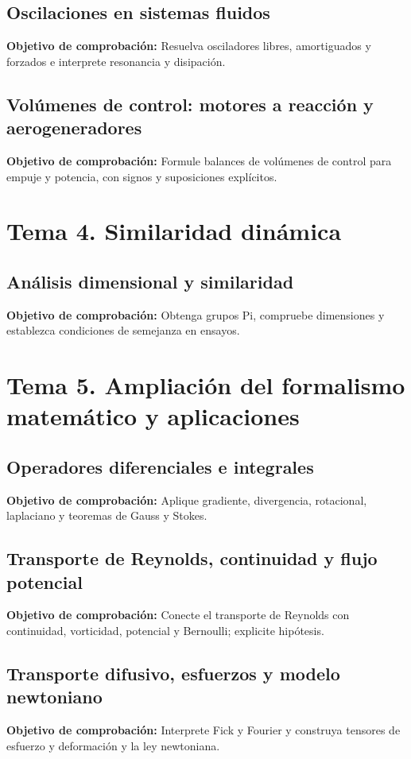 \documentclass[10pt,openany]{book}
\begin{document}
\subsection*{Oscilaciones en sistemas fluidos}
\noindent \textbf{Objetivo de comprobación:} Resuelva osciladores libres, amortiguados y forzados e interprete resonancia y disipación.

\subsection*{Volúmenes de control: motores a reacción y aerogeneradores}
\noindent \textbf{Objetivo de comprobación:} Formule balances de volúmenes de control para empuje y potencia, con signos y suposiciones explícitos.

\section*{Tema 4. Similaridad dinámica}

\subsection*{Análisis dimensional y similaridad}
\noindent \textbf{Objetivo de comprobación:} Obtenga grupos Pi, compruebe dimensiones y establezca condiciones de semejanza en ensayos.

\section*{Tema 5. Ampliación del formalismo matemático y aplicaciones}

\subsection*{Operadores diferenciales e integrales}
\noindent \textbf{Objetivo de comprobación:} Aplique gradiente, divergencia, rotacional, laplaciano y teoremas de Gauss y Stokes.

\subsection*{Transporte de Reynolds, continuidad y flujo potencial}
\noindent \textbf{Objetivo de comprobación:} Conecte el transporte de Reynolds con continuidad, vorticidad, potencial y Bernoulli; explicite hipótesis.

\subsection*{Transporte difusivo, esfuerzos y modelo newtoniano}
\noindent \textbf{Objetivo de comprobación:} Interprete Fick y Fourier y construya tensores de esfuerzo y deformación y la ley newtoniana.
\end{document}
